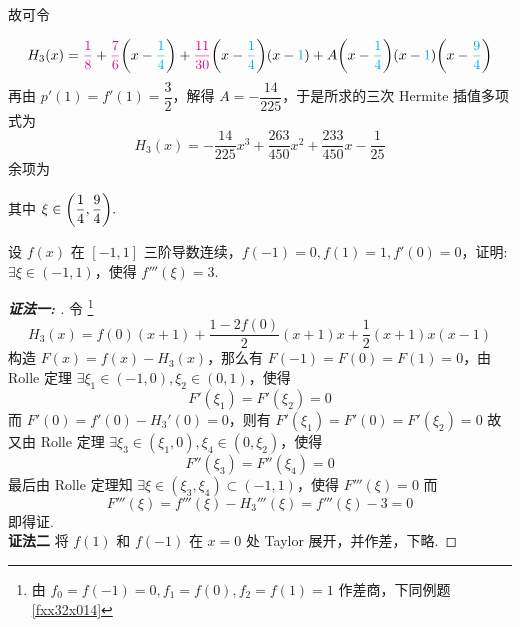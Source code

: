 \begin{solution}
\begin{table}[H]
    \end{table}
    故可令\newline
    \begin{minipage}{0.69\linewidth}
        $$H_3(x)=\textcolor{magenta}{\dfrac{1}{8}}+\textcolor{magenta}{\dfrac{7}{6}}\qty(x-\textcolor{cyan}{\dfrac{1}{4}})+\textcolor{magenta}{\dfrac{11}{30}}\qty(x-\textcolor{cyan}{\dfrac{1}{4}})(x-\textcolor{cyan}{1})+A\qty(x-\textcolor{cyan}{\dfrac{1}{4}})(x-\textcolor{cyan}{1})\qty(x-\textcolor{cyan}{\dfrac{9}{4}})$$
        再由 $p'(1)=f'(1)=\dfrac{3}{2}$，解得 $A=-\dfrac{14}{225}$，于是所求的三次 Hermite 插值多项式为
        $$H_3(x)=-\dfrac{14}{225}x^3+\dfrac{263}{450}x^2+\dfrac{233}{450}x-\dfrac{1}{25}$$
        余项为
        其中 $\xi\in\qty(\dfrac{1}{4},\dfrac{9}{4}).$
    \end{minipage}\hfill
    \begin{minipage}{0.30\linewidth}
        \begin{figure}[H]
            \caption{}
        \end{figure}
    \end{minipage}
\end{solution}

\begin{example}
    设 $f(x)$ 在 $[-1,1]$ 三阶导数连续，$f(-1)=0,f(1)=1,f'(0)=0$，证明: $\exists\xi\in(-1,1)$，使得 $f'''(\xi)=3.$
\end{example}
\begin{proof}[{\songti \textbf{证法一: }}]
    令 \footnote{由 $f_0=f(-1)=0,f_1=f(0),f_2=f(1)=1$ 作差商，下同例题 \ref{fxx32x014}}
    $$H_3(x)= f(0)(x+1)+\dfrac{1-2f(0)}{2}(x+1)x+\dfrac{1}{2}(x+1)x(x-1)$$
    构造 $F(x)=f(x)-H_3(x)$，那么有 $F(-1)=F(0)=F(1)=0$，由 Rolle 定理 $\exists\xi_1\in(-1,0),\xi_2\in(0,1)$，使得 
    $$F'(\xi_1)=F'(\xi_2)=0$$
    而 $F'(0)=f'(0)-H_3'(0)=0$，则有 $F'(\xi_1)=F'(0)=F'(\xi_2)=0$ 故又由 Rolle 定理 $\exists\xi_3\in(\xi_1,0),\xi_4\in(0,\xi_2)$，使得 $$F''(\xi_3)=F''(\xi_4)=0$$
    最后由 Rolle 定理知 $\exists\xi\in(\xi_3,\xi_4)\subset(-1,1)$，使得 $F'''(\xi)=0$
    而 $$F'''(\xi)=f'''(\xi)-H_3'''(\xi)=f'''(\xi)-3=0$$
    即得证.\\
    \textbf{证法二}
    将 $f(1)$ 和 $f(-1)$ 在 $x=0$ 处 Taylor 展开，并作差，下略.
\end{proof}

